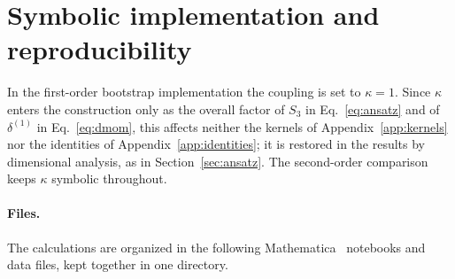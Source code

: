 \documentclass[prd,aps,preprint,nofootinbib,amsmath,amssymb,eqsecnum]{revtex4-2}
\begin{document}
\section{Symbolic implementation and reproducibility}
\label{app:implementation}

In the first-order bootstrap implementation the coupling is set to $\kappa=1$. Since
$\kappa$ enters the construction only as the overall factor of $S_3$ in Eq.~\eqref{eq:ansatz}
and of $\delta^{(1)}$ in Eq.~\eqref{eq:dmom}, this affects neither the kernels of
Appendix~\ref{app:kernels} nor the identities of Appendix~\ref{app:identities}; it is restored
in the results by dimensional analysis, as in Section~\ref{sec:ansatz}. The second-order
comparison keeps $\kappa$ symbolic throughout.

\paragraph{Files.} The calculations are organized in the following Mathematica~\cite{Mathematica}
notebooks and data files, kept together in one directory.
\end{document}
